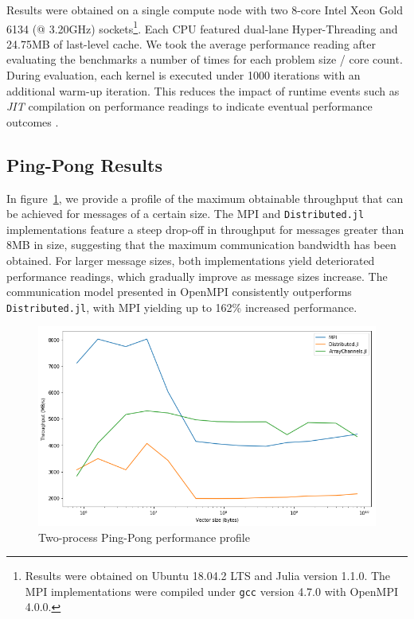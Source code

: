 \documentclass{juliacon}
\begin{document}
Results were obtained on a single compute node with two 8-core Intel
Xeon Gold 6134 (@ 3.20GHz) sockets\footnote{Results were obtained on
	Ubuntu 18.04.2 LTS and Julia version 1.1.0. The MPI implementations
	were compiled under \texttt{gcc} version 4.7.0 with OpenMPI 4.0.0.}.
Each CPU featured dual-lane Hyper-Threading and 24.75MB of last-level
cache. We took the average performance reading after evaluating the
benchmarks a number of times for each problem size / core count. During
evaluation, each kernel is executed under 1000 iterations with an
additional warm-up iteration. This reduces the impact of runtime events
such as \emph{JIT} compilation on performance readings to indicate
eventual performance outcomes \cite{blackburn, kulkarni}.

\subsection{Ping-Pong Results}
\label{sec:pingpong-results}

In figure~\ref{fig:plot-pingpong}, we provide a profile of the
maximum obtainable throughput that can be achieved for messages of a
certain size. The MPI and \texttt{Distributed.jl} implementations
feature a steep drop-off in throughput for messages greater than 8MB in
size, suggesting that the maximum communication bandwidth has been
obtained. For larger message sizes, both implementations yield
deteriorated performance readings, which gradually improve as message
sizes increase. The communication model presented in OpenMPI
consistently outperforms \texttt{Distributed.jl}, with MPI yielding up
to 162\% increased performance.

\begin{figure}[htb]
	\includegraphics[width=\linewidth]{figs/pingpong.png}
	\caption{Two-process Ping-Pong performance profile}
	\label{fig:plot-pingpong}
\end{figure}
\end{document}
